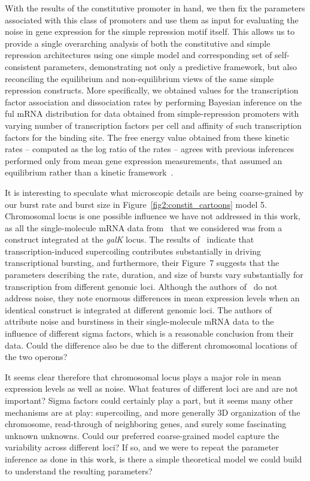 With the results of the constitutive promoter in hand, we then fix the
parameters associated with this class of promoters and use them as input for
evaluating the noise in gene expression for the simple repression motif itself.
This allows us to provide a single overarching analysis of both the constitutive
and simple repression architectures using one simple model and corresponding set
of self-consistent parameters, demonstrating not only a predictive framework,
but also reconciling the equilibrium and non-equilibrium views of the same
simple repression constructs. More specifically, we obtained values for the
transcription factor association and dissociation rates by performing Bayesian
inference on the ful mRNA distribution for data obtained from simple-repression
promoters with varying number of transcription factors per cell and affinity of
such transcription factors for the binding site. The free energy value obtained
from these kinetic rates -- computed as the log ratio of the rates -- agrees
with previous inferences performed only from mean gene expression measurements,
that assumed an equilibrium rather than a kinetic
framework~\cite{Garcia2011a,Razo-Mejia2018}.

It is interesting to speculate what microscopic details are being coarse-grained
by our burst rate and burst size in Figure~\ref{fig2:constit_cartoons} model 5.
Chromosomal locus is one possible influence we have not addressed in this work,
as all the single-molecule mRNA data from~\cite{Jones2014} that we considered
was from a construct integrated at the \textit{galK} locus. The results
of~\cite{Chong2014} indicate that transcription-induced supercoiling contributes
substantially in driving transcriptional bursting, and furthermore, their
Figure~7 suggests that the parameters describing the rate, duration, and size of
bursts vary substantially for transcription from different genomic loci.
Although the authors of~\cite{Englaender2017} do not address noise, they note
enormous differences in mean expression levels when an identical construct is
integrated at different genomic loci. The authors of~\cite{Engl2020} attribute
noise and burstiness in their single-molecule mRNA data to the influence of
different sigma factors, which is a reasonable conclusion from their data. Could
the difference also be due to the different chromosomal locations of the two
operons?

It seems clear therefore that chromosomal locus plays a major role in mean
expression levels as well as noise. What features of different loci are and are
not important? Sigma factors could certainly play a part, but it seems many
other mechanisms are at play: supercoiling, and more generally 3D organization
of the chromosome, read-through of neighboring genes, and surely some
fascinating unknown unknowns. Could our preferred coarse-grained model capture
the variability across different loci? If so, and we were to repeat the
parameter inference as done in this work, is there a simple theoretical model we
could build to understand the resulting parameters?

